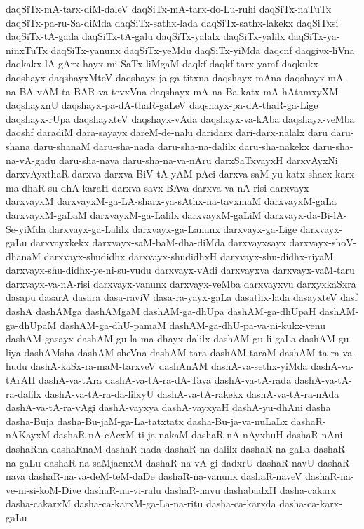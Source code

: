 {daqSiTx-mA-tarx-diM-daleV
daqSiTx-mA-tarx-do-Lu-ruhi
daqSiTx-naTuTx
daqSiTx-pa-ru-Sa-diMda
daqSiTx-sathx-lada
daqSiTx-sathx-lakekx
daqSiTxsi
daqSiTx-tA-gada
daqSiTx-tA-galu
daqSiTx-yalalx
daqSiTx-yalilx
daqSiTx-ya-ninxTuTx
daqSiTx-yanunx
daqSiTx-yeMdu
daqSiTx-yiMda
daqcnf
daqgivx-liVna
daqkakx-lA-gArx-hayx-mi-SaTx-liMgaM
daqkf
daqkf-tarx-yamf
daqkukx
daqshayx
daqshayxMteV
daqshayx-ja-ga-titxna
daqshayx-mAna
daqshayx-mA-na-BA-vAM-ta-BAR-va-tevxVna
daqshayx-mA-na-Ba-katx-mA-hAtamxyXM
daqshayxnU
daqshayx-pa-dA-thaR-gaLeV
daqshayx-pa-dA-thaR-ga-Lige
daqshayx-rUpa
daqshayxteV
daqshayx-vAda
daqshayx-va-kAba
daqshayx-veMba
daqshf
daradiM
dara-sayayx
dareM-de-nalu
daridarx
dari-darx-nalalx
daru
daru-shana
daru-shanaM
daru-sha-nada
daru-sha-na-dalilx
daru-sha-nakekx
daru-sha-na-vA-gadu
daru-sha-nava
daru-sha-na-va-nAru
darxSaTxvayxH
darxvAyxNi
darxvAyxthaR
darxva
darxva-BiV-tA-yAM-pAci
darxva-saM-yu-katx-shacx-karx-ma-dhaR-su-dhA-karaH
darxva-savx-BAva
darxva-va-nA-risi
darxvayx
darxvayxM
darxvayxM-ga-LA-sharx-ya-sAthx-na-tavxmaM
darxvayxM-gaLa
darxvayxM-gaLaM
darxvayxM-ga-Lalilx
darxvayxM-gaLiM
darxvayx-da-Bi-lA-Se-yiMda
darxvayx-ga-Lalilx
darxvayx-ga-Lanunx
darxvayx-ga-Lige
darxvayx-gaLu
darxvayxkekx
darxvayx-saM-baM-dha-diMda
darxvayxsayx
darxvayx-shoV-dhanaM
darxvayx-shudidhx
darxvayx-shudidhxH
darxvayx-shu-didhx-riyaM
darxvayx-shu-didhx-ye-ni-su-vudu
darxvayx-vAdi
darxvayxva
darxvayx-vaM-taru
darxvayx-va-nA-risi
darxvayx-vanunx
darxvayx-veMba
darxvayxvu
darxyxkaSxra
dasapu
dasarA
dasara
dasa-raviV
dasa-ra-yayx-gaLa
dasathx-lada
dasayxteV
dasf
dashA
dashAMga
dashAMgaM
dashAM-ga-dhUpa
dashAM-ga-dhUpaH
dashAM-ga-dhUpaM
dashAM-ga-dhU-pamaM
dashAM-ga-dhU-pa-va-ni-kukx-venu
dashAM-gasayx
dashAM-gu-la-ma-dhayx-dalilx
dashAM-gu-li-gaLa
dashAM-gu-liya
dashAMsha
dashAM-sheVna
dashAM-tara
dashAM-taraM
dashAM-ta-ra-va-hudu
dashA-kaSx-ra-maM-tarxveV
dashAnAM
dashA-va-sethx-yiMda
dashA-va-tArAH
dashA-va-tAra
dashA-va-tA-ra-dA-Tava
dashA-va-tA-rada
dashA-va-tA-ra-dalilx
dashA-va-tA-ra-da-lilxyU
dashA-va-tA-rakekx
dashA-va-tA-ra-nAda
dashA-va-tA-ra-vAgi
dashA-vayxya
dashA-vayxyaH
dashA-yu-dhAni
dasha
dasha-Buja
dasha-Bu-jaM-ga-La-tatxtatx
dasha-Bu-ja-va-nuLaLx
dashaR-nAKayxM
dashaR-nA-cAcxM-ti-ja-nakaM
dashaR-nA-nAyxhuH
dashaR-nAni
dashaRna
dashaRnaM
dashaR-nada
dashaR-na-dalilx
dashaR-na-gaLa
dashaR-na-gaLu
dashaR-na-saMjacnxM
dashaR-na-vA-gi-dadxrU
dashaR-navU
dashaR-nava
dashaR-na-va-deM-teM-daDe
dashaR-na-vanunx
dashaR-naveV
dashaR-na-ve-ni-si-koM-Dive
dashaR-na-vi-ralu
dashaR-navu
dashabadxH
dasha-cakarx
dasha-cakarxM
dasha-ca-karxM-ga-La-na-ritu
dasha-ca-karxda
dasha-ca-karx-gaLu
}
